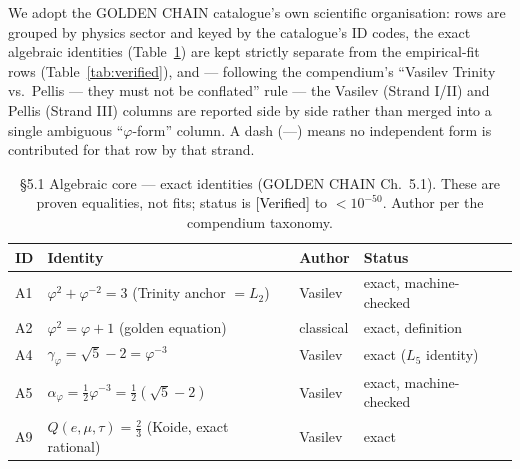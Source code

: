 \documentclass[11pt]{article}
\newcommand{\Verified}{\textcolor{black}{[Verified]}}
\newcommand{\phigr}{\varphi}
\begin{document}
We adopt the GOLDEN CHAIN catalogue's own scientific organisation: rows are grouped by physics sector and keyed by the catalogue's ID codes, the exact algebraic identities (Table~\ref{tab:algebraic}) are kept strictly separate from the empirical-fit rows (Table~\ref{tab:verified}), and --- following the compendium's ``Vasilev Trinity vs.\ Pellis --- they must not be conflated'' rule --- the Vasilev (Strand I/II) and Pellis (Strand III) columns are reported side by side rather than merged into a single ambiguous ``$\phigr$-form'' column. A dash (---) means no independent form is contributed for that row by that strand.

\begin{table}[ht]
\centering
\caption{\S5.1 Algebraic core --- exact identities (GOLDEN CHAIN Ch.\ 5.1). These are proven equalities, not fits; status is \Verified{} to $<10^{-50}$. Author per the compendium taxonomy.}
\label{tab:algebraic}
\small
\begin{tabular}{@{}llll@{}}
\toprule
ID & Identity & Author & Status \\
\midrule
A1 & $\phigr^2 + \phigr^{-2} = 3$ (Trinity anchor $= L_2$) & Vasilev & exact, machine-checked \\
A2 & $\phigr^2 = \phigr + 1$ (golden equation) & classical & exact, definition \\
A4 & $\gamma_{\phigr} = \sqrt{5} - 2 = \phigr^{-3}$ & Vasilev & exact ($L_5$ identity) \\
A5 & $\alpha_{\phigr} = \tfrac{1}{2}\phigr^{-3} = \tfrac{1}{2}(\sqrt{5}-2)$ & Vasilev & exact, machine-checked \\
A9 & $Q(e,\mu,\tau) = \tfrac{2}{3}$ (Koide, exact rational) & Vasilev & exact \\
\bottomrule
\end{tabular}
\end{table}
\end{document}

